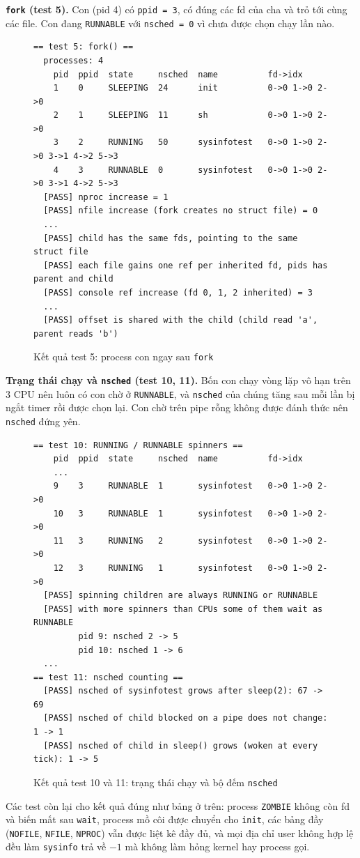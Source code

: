 \textbf{\texttt{fork} (test 5).} Con (pid 4) có \texttt{ppid = 3}, có đúng các fd của cha và trỏ tới cùng các file. Con đang \texttt{RUNNABLE} với \texttt{nsched = 0} vì chưa được chọn chạy lần nào.

\begin{figure}[H]
\begin{lstlisting}[style=ketqua]
== test 5: fork() ==
  processes: 4
    pid  ppid  state     nsched  name          fd->idx
    1    0     SLEEPING  24      init          0->0 1->0 2->0
    2    1     SLEEPING  11      sh            0->0 1->0 2->0
    3    2     RUNNING   50      sysinfotest   0->0 1->0 2->0 3->1 4->2 5->3
    4    3     RUNNABLE  0       sysinfotest   0->0 1->0 2->0 3->1 4->2 5->3
  [PASS] nproc increase = 1
  [PASS] nfile increase (fork creates no struct file) = 0
  ...
  [PASS] child has the same fds, pointing to the same struct file
  [PASS] each file gains one ref per inherited fd, pids has parent and child
  [PASS] console ref increase (fd 0, 1, 2 inherited) = 3
  ...
  [PASS] offset is shared with the child (child read 'a', parent reads 'b')
\end{lstlisting}
\caption{Kết quả test 5: process con ngay sau \texttt{fork}}
\end{figure}

\textbf{Trạng thái chạy và \texttt{nsched} (test 10, 11).} Bốn con chạy vòng lặp vô hạn trên 3 CPU nên luôn có con chờ ở \texttt{RUNNABLE}, và \texttt{nsched} của chúng tăng sau mỗi lần bị ngắt timer rồi được chọn lại. Con chờ trên pipe rỗng không được đánh thức nên \texttt{nsched} đứng yên.

\begin{figure}[H]
\begin{lstlisting}[style=ketqua]
== test 10: RUNNING / RUNNABLE spinners ==
    pid  ppid  state     nsched  name          fd->idx
    ...
    9    3     RUNNABLE  1       sysinfotest   0->0 1->0 2->0
    10   3     RUNNABLE  1       sysinfotest   0->0 1->0 2->0
    11   3     RUNNING   2       sysinfotest   0->0 1->0 2->0
    12   3     RUNNING   1       sysinfotest   0->0 1->0 2->0
  [PASS] spinning children are always RUNNING or RUNNABLE
  [PASS] with more spinners than CPUs some of them wait as RUNNABLE
         pid 9: nsched 2 -> 5
         pid 10: nsched 1 -> 6
  ...
== test 11: nsched counting ==
  [PASS] nsched of sysinfotest grows after sleep(2): 67 -> 69
  [PASS] nsched of child blocked on a pipe does not change: 1 -> 1
  [PASS] nsched of child in sleep() grows (woken at every tick): 1 -> 5
\end{lstlisting}
\caption{Kết quả test 10 và 11: trạng thái chạy và bộ đếm \texttt{nsched}}
\end{figure}

Các test còn lại cho kết quả đúng như bảng ở trên: process \texttt{ZOMBIE} không còn fd và biến mất sau \texttt{wait}, process mồ côi được chuyển cho \texttt{init}, các bảng đầy (\texttt{NOFILE}, \texttt{NFILE}, \texttt{NPROC}) vẫn được liệt kê đầy đủ, và mọi địa chỉ user không hợp lệ đều làm \texttt{sysinfo} trả về $-1$ mà không làm hỏng kernel hay process gọi.
